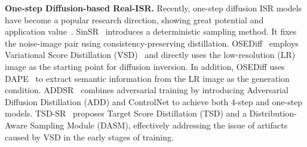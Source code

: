\textbf{One-step Diffusion-based Real-ISR.} Recently, one-step diffusion ISR models have become a popular research direction, showing great potential and application value~\cite{wang2023sinsr, wu2024one, xie2024addsr, he2024one, dong2024tsd}. SinSR~\cite{wang2023sinsr} introduces a deterministic sampling method. It fixes the noise-image pair using consistency-preserving distillation. OSEDiff~\cite{wu2024one} employs Variational Score Distillation (VSD)~\cite{wang2024prolificdreamer, nguyen2024swiftbrush} and directly uses the low-resolution (LR) image as the starting point for diffusion inversion. In addition, OSEDiff uses DAPE~\cite{wu2024seesr} to extract semantic information from the LR image as the generation condition. ADDSR~\cite{xie2024addsr} combines adversarial training by introducing Adversarial Diffusion Distillation (ADD) and ControlNet to achieve both 4-step and one-step models. TSD-SR~\cite{dong2024tsd} proposes Target Score Distillation (TSD) and a Distribution-Aware Sampling Module (DASM), effectively addressing the issue of artifacts caused by VSD in the early stages of training.